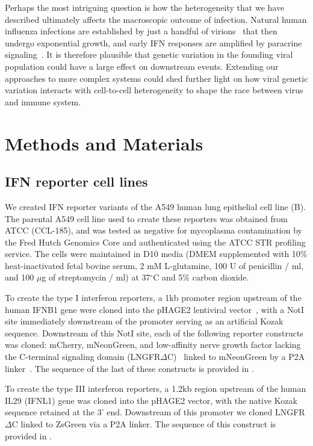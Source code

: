 \documentclass[9pt,lineno]{elife}
\begin{document}
Perhaps the most intriguing question is how the heterogeneity that we have described ultimately affects the macroscopic outcome of infection.
Natural human influenza infections are established by just a handful of virions~\citep{mccrone2018stochastic, xue2018reconciling, varble2014influenza} that then undergo exponential growth, and early IFN responses are amplified by paracrine signaling~\citep{stetson2006type,honda2006type}.
It is therefore plausible that genetic variation in the founding viral population could have a large effect on downstream events.
Extending our approaches to more complex systems could shed further light on how viral genetic variation interacts with cell-to-cell heterogeneity to shape the race between virus and immune system.

\clearpage


\section{Methods and Materials}

\subsection{IFN reporter cell lines}
We created IFN reporter variants of the A549 human lung epithelial cell line (B).
The parental A549 cell line used to create these reporters was obtained from ATCC (CCL-185), and was tested as negative for mycoplasma contamination by the Fred Hutch Genomics Core and authenticated using the ATCC STR profiling service.
The cells were maintained in D10 media (DMEM supplemented with 10\% heat-inactivated fetal bovine serum, 2 mM L-glutamine, 100 U of penicillin / ml, and 100 $\mu$g of streptomycin / ml) at 37$^{\circ}$C and 5\% carbon dioxide.

To create the type I interferon reporters, a 1kb promoter region upstream of the human IFNB1 gene were cloned into the pHAGE2 lentiviral vector~\citep{oconnell2010lentiviral}, with a NotI site immediately downstream of the promoter serving as an artificial Kozak sequence. 
Downstream of this NotI site, each of the following reporter constructs was cloned: mCherry, mNeonGreen, and low-affinity nerve growth factor lacking the C-terminal signaling domain (LNGFR$\Delta$C)~\citep{bonini1997hsv,ruggieri1997cell} linked to mNeonGreen by a P2A linker~\citep{kim2011high}.
The sequence of the last of these constructs is provided in .

To create the type III interferon reporters, a 1.2kb region upstream of the human IL29 (IFNL1) gene was cloned into the pHAGE2 vector, with the native Kozak sequence retained at the 3' end. 
Downstream of this promoter we cloned LNGFR$\Delta$C linked to ZsGreen via a P2A linker.
The sequence of this construct is provided in .
 
\end{document}
